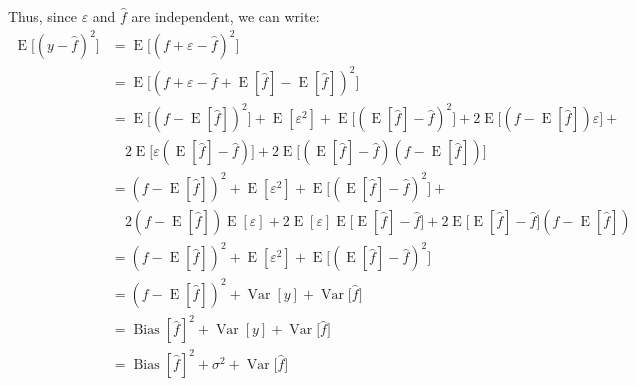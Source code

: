 Thus, since $\varepsilon$ and $\hat {f}$ are independent, we can write:
\begin{align*}
	\operatorname {E} {\big [}(y-{\hat {f}})^{2}{\big ]}&=\operatorname {E} {\big [}(f+\varepsilon -{\hat {f}})^{2}{\big ]}\\
	&=\operatorname {E} {\big [}(f+\varepsilon -{\hat {f}}+\operatorname {E} [{\hat {f}}]-\operatorname {E} [{\hat {f}}])^{2}{\big ]}\\
	&=\operatorname {E} {\big [}(f-\operatorname {E} [{\hat {f}}])^{2}{\big ]}+\operatorname {E} [\varepsilon ^{2}]+\operatorname {E} {\big [}(\operatorname {E} [{\hat {f}}]-{\hat {f}})^{2}{\big ]}+2\operatorname {E} {\big [}(f-\operatorname {E} [{\hat {f}}])\varepsilon {\big ]}+\\
	&\quad 2\operatorname {E} {\big [}\varepsilon (\operatorname {E} [{\hat {f}}]-{\hat {f}}){\big ]}+2\operatorname {E} {\big [}(\operatorname {E} [{\hat {f}}]-{\hat {f}})(f-\operatorname {E} [{\hat {f}}]){\big ]}\\
	&=(f-\operatorname {E} [{\hat {f}}])^{2}+\operatorname {E} [\varepsilon ^{2}]+\operatorname {E} {\big [}(\operatorname {E} [{\hat {f}}]-{\hat {f}})^{2}{\big ]}+\\
	&\quad 2(f-\operatorname {E} [{\hat {f}}])\operatorname {E} [\varepsilon ]+2\operatorname {E} [\varepsilon ]\operatorname {E} {\big [}\operatorname {E} [{\hat {f}}]-{\hat {f}}{\big ]}+2\operatorname {E} {\big [}\operatorname {E} [{\hat {f}}]-{\hat {f}}{\big ]}(f-\operatorname {E} [{\hat {f}}])\\
	&=(f-\operatorname {E} [{\hat {f}}])^{2}+\operatorname {E} [\varepsilon ^{2}]+\operatorname {E} {\big [}(\operatorname {E} [{\hat {f}}]-{\hat {f}})^{2}{\big ]}\\
	&=(f-\operatorname {E} [{\hat {f}}])^{2}+\operatorname {Var} [y]+\operatorname {Var} {\big [}{\hat {f}}{\big ]}\\
	&=\operatorname {Bias} [{\hat {f}}]^{2}+\operatorname {Var} [y]+\operatorname {Var} {\big [}{\hat {f}}{\big ]}\\
	&=\operatorname {Bias} [{\hat {f}}]^{2}+\sigma ^{2}+\operatorname {Var} {\big [}{\hat {f}}{\big ]}
\end{align*}
